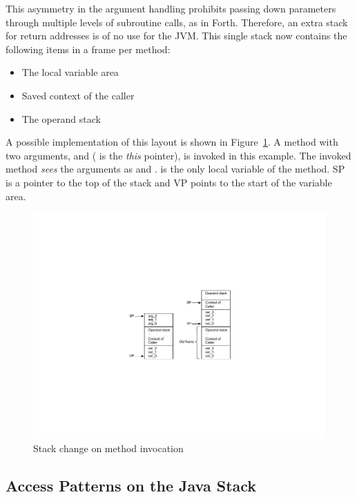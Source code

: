 This asymmetry in the argument handling prohibits passing down
parameters through multiple levels of subroutine calls, as in Forth.
Therefore, an extra stack for return addresses is of no use for the
JVM. This single stack now contains the following items in a frame
per method:
%
\begin{itemize}
\item The local variable area
\item Saved context of the caller
\item The operand stack
\end{itemize}
%
A possible implementation of this layout is shown in
Figure~\ref{fig_stack_invoke}. A method with two arguments,
 and  ( is the
\emph{this} pointer), is invoked in this example. The invoked method
\emph{sees} the arguments as  and .
 is the only local variable of the method. SP is a
pointer to the top of the stack and VP points to the start of the
variable area.

\begin{figure}
    \centering
    \includegraphics[scale=\picscale]{stack/stack_invocation}
    \caption{Stack change on method invocation}
    \label{fig_stack_invoke}
\end{figure}

\subsection{Access Patterns on the Java Stack}
\label{subsec:access}

